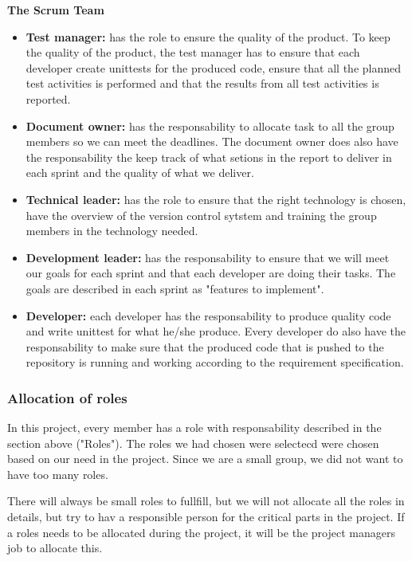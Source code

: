 \noindent
{\bf The Scrum Team}
\begin{itemize}

  \item {\bf Test manager:} has the role to ensure the quality of the product. To keep the quality 
  of the product, the test manager has to ensure that each developer create unittests for the 
  produced code, ensure that all the planned test activities is performed and that the results 
  from all test activities is reported.

  \item {\bf Document owner:} has the responsability to allocate task to all the group members so we can meet the deadlines. The document owner does also have the responsability the keep track of what setions in the report to deliver in each sprint and the quality of what we deliver.

  \item {\bf Technical leader:} has the role to ensure that the right technology is
  chosen, have the overview of the version control sytstem and training the group members
  in the technology needed.

  \item {\bf Development leader:} has the responsability to ensure that we will meet our goals
  for each sprint and that each developer are doing their tasks. The goals are described in each 
  sprint as "features to implement". 

  \item {\bf Developer:} each developer has the responsability to produce quality code
  and write unittest for what he/she produce. Every developer do also have the responsability
  to make sure that the produced code that is pushed to the repository is running and working
  according to the requirement specification.
  \end{itemize} 

\subsubsection{Allocation of roles}
In this project, every member has a role with responsability described in the section above ("Roles").
The roles we had chosen were selectecd were chosen based on our need in the project. 
Since we are a small group, we did not want to have too many roles.

There will always be small roles to fullfill, but we will not allocate all the roles in details, 
but try to hav a responsible person for the critical parts in the project.
If a roles needs to be allocated during the project, it will be the project managers job to
allocate this.

